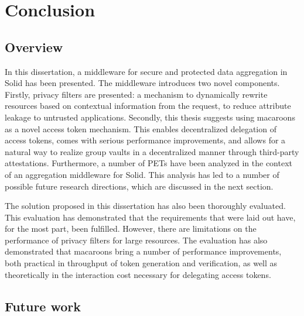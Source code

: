 \chapter{Conclusion}
\label{cha:conclusion}
\section{Overview}
In this dissertation, a middleware for secure and protected data aggregation in Solid has been presented. The middleware introduces two novel components. Firstly, privacy filters are presented: a mechanism to dynamically rewrite resources based on contextual information from the request, to reduce attribute leakage to untrusted applications. Secondly, this thesis suggests using macaroons as a novel access token mechanism. This enables decentralized delegation of access tokens, comes with serious performance improvements, and allows for a natural way to realize group vaults in a decentralized manner through third-party attestations. Furthermore, a number of \acrlong{PETs} have been analyzed in the context of an aggregation middleware for Solid. This analysis has led to a number of possible future research directions, which are discussed in the next section.

The solution proposed in this dissertation has also been thoroughly evaluated. This evaluation has demonstrated that the requirements that were laid out have, for the most part, been fulfilled. However, there are limitations on the performance of privacy filters for large resources. The evaluation has also demonstrated that macaroons bring a number of performance improvements, both practical in throughput of token generation and verification, as well as theoretically in the interaction cost necessary for delegating access tokens.


\section{Future work}

